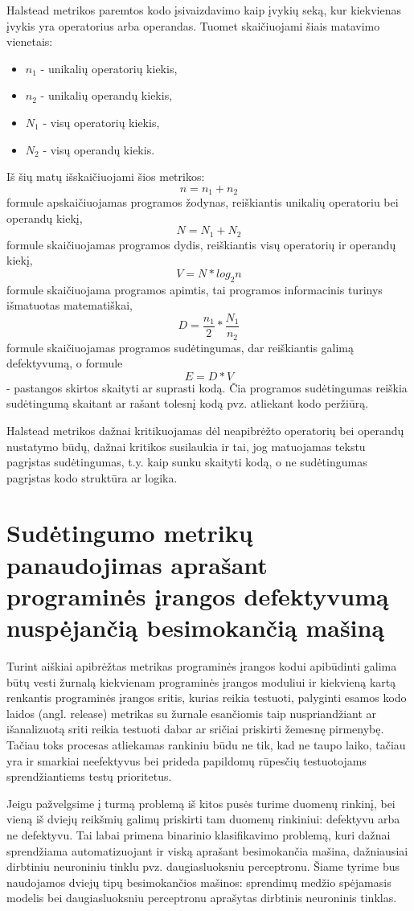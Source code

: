 \documentclass{VUMIFPSbakalaurinis}
\begin{document}
Halstead metrikos paremtos kodo įsivaizdavimo kaip įvykių seką, kur kiekvienas įvykis yra operatorius arba operandas. Tuomet skaičiuojami šiais matavimo vienetais:
\begin{itemize}  
\item[]\(n_1\) - unikalių operatorių kiekis,
\item[]\(n_2\) - unikalių operandų kiekis,
\item[]\(N_1\) - visų operatorių kiekis,
\item[]\(N_2\) - visų operandų kiekis.
\end{itemize} 
Iš šių matų išskaičiuojami šios metrikos: \[n =  n_1 + n_2\]formule apskaičiuojamas programos žodynas, reiškiantis unikalių operatoriu bei operandų kiekį, \[N = N_1 + N_2\]formule skaičiuojamas programos dydis, reiškiantis visų operatorių ir operandų kiekį, \[V = N * log_2n\]formule skaičiuojama programos apimtis, tai programos informacinis turinys išmatuotas matematiškai, \[D = \frac{n_1}{2} * \frac{N_1}{n_2}\]formule skaičiuojamas programos sudėtingumas, dar reiškiantis galimą defektyvumą, o formule \[E = D * V\] - pastangos skirtos skaityti ar suprasti kodą. Čia programos sudėtingumas reiškia sudėtingumą skaitant ar rašant tolesnį kodą pvz. atliekant kodo peržiūrą.

Halstead metrikos dažnai kritikuojamas dėl neapibrėžto operatorių bei operandų nustatymo būdų, dažnai kritikos susilaukia ir tai, jog matuojamas tekstu pagrįstas sudėtingumas, t.y. kaip sunku skaityti kodą, o ne sudėtingumas pagrįstas kodo struktūra ar logika.

\section{Sudėtingumo metrikų panaudojimas aprašant programinės įrangos defektyvumą nuspėjančią besimokančią mašiną}

Turint aiškiai apibrėžtas metrikas programinės įrangos kodui apibūdinti galima būtų vesti žurnalą kiekvienam programinės įrangos moduliui ir kiekvieną kartą renkantis programinės įrangos sritis, kurias reikia testuoti, palyginti esamos kodo laidos (angl. release) metrikas su žurnale esančiomis taip nuspriandžiant ar išanalizuotą sriti reikia testuoti dabar ar sričiai priskirti žemesnę pirmenybę. Tačiau toks procesas atliekamas rankiniu būdu ne tik, kad ne taupo laiko, tačiau yra ir smarkiai neefektyvus bei prideda papildomų rūpesčių testuotojams sprendžiantiems testų prioritetus.

Jeigu pažvelgsime į turmą problemą iš kitos pusės turime duomenų rinkinį, bei vieną iš dviejų reikšmių galimų priskirti tam duomenų rinkiniui: defektyvu arba ne defektyvu. Tai labai primena binarinio klasifikavimo problemą, kuri dažnai sprendžiama automatizuojant ir viską aprašant besimokančia mašina, dažniausiai dirbtiniu neuroniniu tinklu pvz. daugiasluoksniu perceptronu. Šiame tyrime bus naudojamos dviejų tipų besimokančios mašinos: sprendimų medžio spėjamasis modelis bei daugiasluoksniu perceptronu aprašytas dirbtinis neuroninis tinklas.
\end{document}
